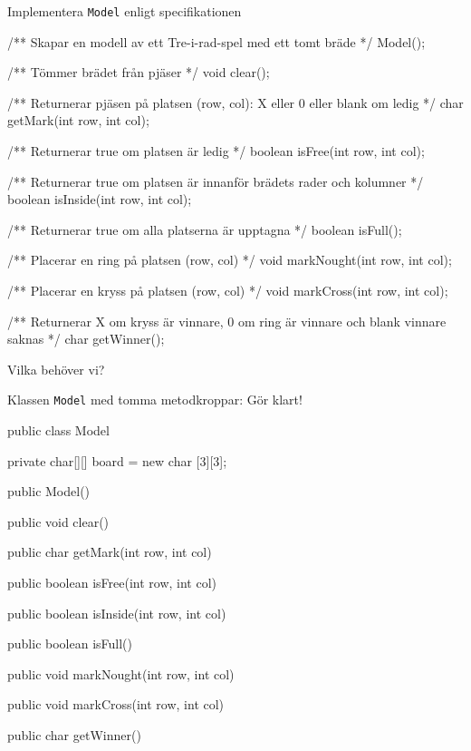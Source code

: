 \documentclass{lecturenotes}
\begin{document}
\begin{Slide}{Implementera \texttt{Model} enligt specifikationen}
\vspace{-2em}
\begin{ClassSpec}{}
/** Skapar en modell av ett Tre-i-rad-spel med ett tomt bräde */
Model();

/** Tömmer brädet från pjäser */
void clear();

/** Returnerar pjäsen på platsen (row, col): X eller 0 eller blank om ledig  */
char getMark(int row, int col);

/** Returnerar true om platsen är ledig */
boolean isFree(int row, int col);

/** Returnerar true om platsen är innanför brädets rader och kolumner */
boolean isInside(int row, int col);

/** Returnerar true om alla platserna är upptagna */
boolean isFull();

/** Placerar en ring på platsen (row, col) */
void markNought(int row, int col);

/** Placerar en kryss på platsen (row, col) */
void markCross(int row, int col);

/** Returnerar X om kryss är vinnare, 0 om ring är vinnare och blank vinnare saknas */
char getWinner();
\end{ClassSpec}
\footnotesize\vspace{-0.2em} Vilka  behöver vi? 
\end{Slide}

\begin{Slide}{Klassen \texttt{Model} med tomma metodkroppar: Gör klart!}

\begin{Code}
public class Model {
    private char[][] board = new char [3][3];
    
    public Model(){    }
    
    public void clear(){    }
    
    public char getMark(int row, int col){    }
    
    public boolean isFree(int row, int col){    }

    public boolean isInside(int row, int col){    }
    
    public boolean isFull(){    }

    public void markNought(int row, int col){    }

    public void markCross(int row, int col){    }
    
    public char getWinner(){    }
}
\end{Code}
\end{Slide}
\end{document}
